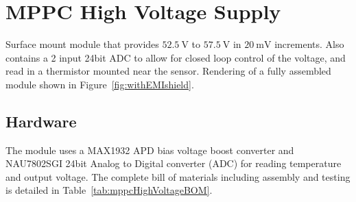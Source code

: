 \section{MPPC High Voltage Supply}

Surface mount module that provides $\SI{52.5}{\volt}$ to $\SI{57.5}{\volt}$ in $\SI{20}{\milli\volt}$ increments. Also contains a 2 input 24bit ADC to allow for closed loop control of the voltage, and read in a thermistor mounted near the sensor. Rendering of a fully assembled module shown in  Figure~\ref{fig:withEMIshield}.


\subsection{Hardware}
The module uses a MAX1932 APD bias voltage boost converter and NAU7802SGI 24bit Analog to Digital converter (ADC) for reading temperature and output voltage. The complete bill of materials including assembly and testing is detailed in Table~\ref{tab:mppcHighVoltageBOM}.

